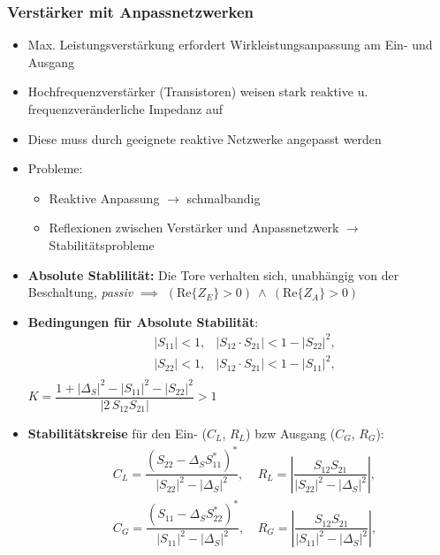 \subsubsection{Verstärker mit Anpassnetzwerken}
\begin{itemize}
    \itemsep0pt
    \item Max. Leistungsverstärkung erfordert Wirkleistungsanpassung am Ein- und Ausgang
    \item Hochfrequenzverstärker (Transistoren) weisen stark reaktive u. frequenzveränderliche Impedanz auf
    \item Diese muss durch geeignete reaktive Netzwerke angepasst werden
    \item Probleme:\vspace{-.5cm}
        \begin{itemize}
            \itemsep0pt
            \item Reaktive Anpassung $\to$ schmalbandig
            \item Reflexionen zwischen Verstärker und Anpassnetzwerk $\to$ Stabilitätsprobleme
        \end{itemize}
    \item \textbf{Absolute Stablilität:} Die Tore verhalten sich, unabhängig von der Beschaltung, \textit{passiv} $\implies$ \(\left(\mathrm{Re}\{Z_E\} > 0\right) \:\wedge\: \left(\mathrm{Re}\{Z_A\} > 0\right)\)
    \item \textbf{Bedingungen für Absolute Stabilität}:
    \begin{align*}
        &|S_{11}| < 1, &|S_{12} \cdot S_{21}| < 1 - |S_{22}|^2,\\
        &|S_{22}| < 1, &|S_{12} \cdot S_{21}| < 1 - |S_{11}|^2,\\
    \end{align*}
        \(K = \dfrac{1 + |\Delta_S|^2 - |S_{11}|^2 - |S_{22}|^2}{|2\, S_{12} S_{21}|} > 1\)
    \item \textbf{Stabilitätskreise} für den Ein- ($C_L$, $R_L$) bzw Ausgang ($C_G$, $R_G$):
        \begin{align*}
            &C_L = \dfrac{\left(S_{22} - \Delta_S S_{11}^*\right)^*}{|S_{22}|^2 - |\Delta_S|^2},\
            &R_L = \left|\dfrac{S_{12} S_{21}}{|S_{22}|^2 - |\Delta_S|^2}\right|,\\
            &C_G = \dfrac{\left(S_{11} - \Delta_S S_{22}^*\right)^*}{|S_{11}|^2 - |\Delta_S|^2},\
            &R_G = \left|\dfrac{S_{12} S_{21}}{|S_{11}|^2 - |\Delta_S|^2}\right|,
        \end{align*}
\end{itemize}
